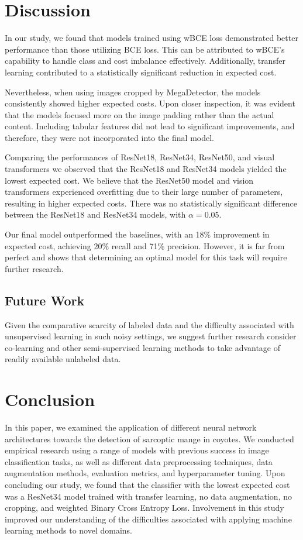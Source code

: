 \documentclass{article}
\begin{document}

\section{Discussion} \label{sec:discussion}
In our study, we found that models trained using wBCE loss demonstrated better performance than those utilizing BCE loss. This can be attributed to wBCE's capability to handle class and cost imbalance effectively. Additionally, transfer learning contributed to a statistically significant reduction in expected cost.

Nevertheless, when using images cropped by MegaDetector, the models consistently showed higher expected costs. Upon closer inspection, it was evident that the models focused more on the image padding rather than the actual content. Including tabular features did not lead to significant improvements, and therefore, they were not incorporated into the final model.

Comparing the performances of ResNet18, ResNet34, ResNet50, and visual transformers we observed that the ResNet18 and ResNet34 models yielded the lowest expected cost. We believe that the ResNet50 model and vision transformers experienced overfitting due to their large number of parameters, resulting in higher expected costs. There was no statistically significant difference between the ResNet18 and ResNet34 models, with $\alpha = 0.05$. 

Our final model outperformed the baselines, with an 18\% improvement in expected cost, achieving 20\% recall and 71\% precision. However, it is far from perfect and shows that determining an optimal model for this task will require further research.
 
\subsection{Future Work}
Given the comparative scarcity of labeled data and the difficulty associated with unsupervised learning in such noisy settings, we suggest further research consider co-learning \cite{Blum:1998} and other semi-supervised learning methods to take advantage of readily available unlabeled data.

\section{Conclusion}
In this paper, we examined the application of different neural network architectures towards the detection of sarcoptic mange in coyotes. We conducted empirical research using a range of models with previous success in image classification tasks, as well as different data preprocessing techniques, data augmentation methods, evaluation metrics, and hyperparameter tuning. 
Upon concluding our study, we found that the classifier with the lowest expected cost was a ResNet34 model trained with transfer learning, no data augmentation, no
cropping, and weighted Binary Cross Entropy Loss. Involvement in this study improved our understanding of the difficulties associated with applying machine learning methods to novel domains. 
\end{document}
